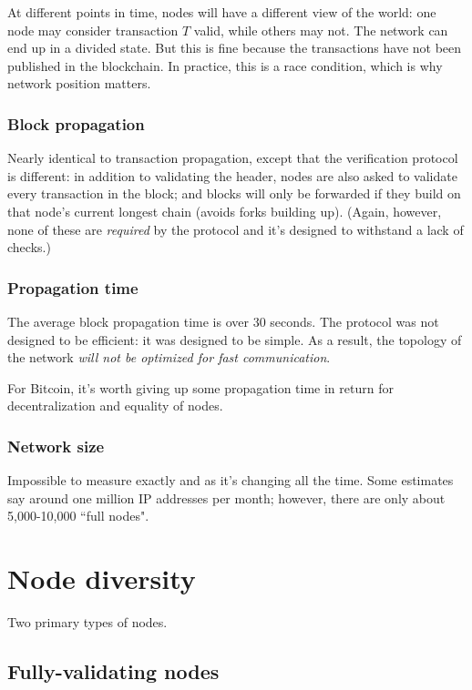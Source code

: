 \documentclass[12pt]{article}
\begin{document}
At different points in time, nodes will have a different view of the world: one node may consider transaction $T$ valid, while others may not. The network can end up in a divided state. But this is fine because the transactions have not been published in the blockchain. In practice, this is a race condition, which is why network position matters.

\subsubsection*{Block propagation}

Nearly identical to transaction propagation, except that the verification protocol is different: in addition to validating the header, nodes are also asked to validate every transaction in the block; and blocks will only be forwarded if they build on that node's current longest chain (avoids forks building up). (Again, however, none of these are \textit{required} by the protocol and it's designed to withstand a lack of checks.)

\subsubsection*{Propagation time}

The average block propagation time is over 30 seconds. The protocol was not designed to be efficient: it was designed to be simple. As a result, the topology of the network \textit{will not be optimized for fast communication}.

For Bitcoin, it's worth giving up some propagation time in return for decentralization and equality of nodes.

\subsubsection*{Network size}

Impossible to measure exactly and as it's changing all the time. Some estimates say around one million IP addresses per month; however, there are only about 5,000-10,000 ``full nodes".

\section*{Node diversity}

Two primary types of nodes.

\subsection*{Fully-validating nodes}
\end{document}
